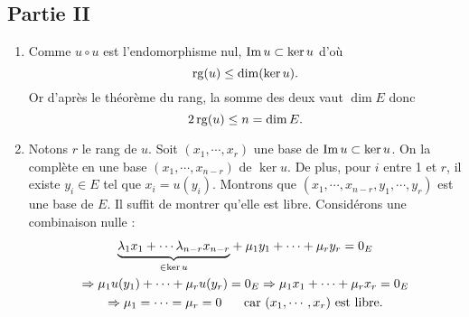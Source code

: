 \subsection*{Partie II}
\begin{enumerate}
 \item Comme $u\circ u$ est l'endomorphisme nul, $\operatorname{Im} u\subset\ker u$ d'où
\[
\operatorname{rg} (u)\leq \dim (\ker u).
\]
Or d'après le théorème du rang, la somme des deux vaut $\dim E$ donc
\[
2\operatorname{rg}(u)\leq n= \dim E.
\]
\item Notons $r$ le rang de $u$. Soit $(x_1,\cdots,x_r)$ une base de $\operatorname{Im} u \subset \ker u$. On la complète en une base $(x_1,\cdots,x_{n-r})$ de $\ker u$. De plus, pour $i$ entre 1 et $r$, il existe $y_i \in E$ tel que $x_i=u(y_i)$.\newline
Montrons que $(x_1,\cdots,x_{n-r},y_1,\cdots,y_r)$ est une base de $E$.\newline
Il suffit de montrer qu'elle est libre. Considérons une combinaison nulle :
\begin{multline*}
\underset{\in \ker u}{\underbrace{\lambda_1x_1+\cdots \lambda_{n-r}x_{n-r}}} +\mu_1y_1+\cdots+\mu_ry_r=0_E  \\
 \Rightarrow \mu_1u(y_1) + \cdots + \mu_ru(y_r) = 0_E 
 \Rightarrow \mu_1 x_1 + \cdots + \mu_r x_r = 0_E \\
 \Rightarrow \mu_1 = \cdots = \mu_r = 0 
 \hspace{0.5cm} \text{ car $(x_1,\cdots,x_r)$ est libre.}
\end{multline*}


\end{enumerate}
